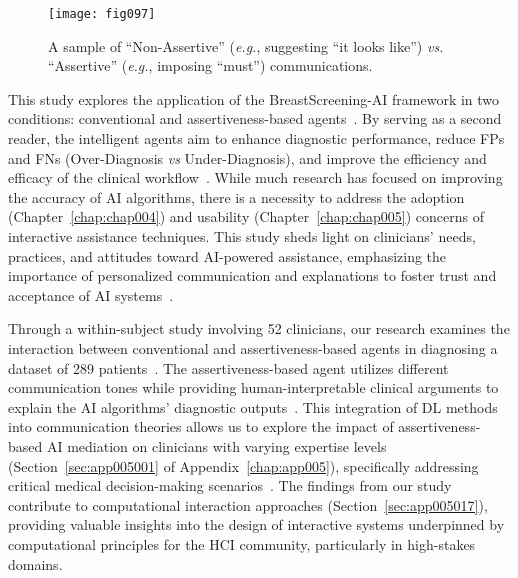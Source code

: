 \begin{figure}[htpb]
\texttt{[image: fig097]}
\caption[]{A sample of ``Non-Assertive'' ({\it e.g.}, suggesting ``it looks like'') {\it vs.} ``Assertive'' ({\it e.g.}, imposing ``must'') communications.}
\label{fig:fig097}
\end{figure}

This study explores the application of the BreastScreening-AI framework in two conditions: conventional and assertiveness-based agents~\cite{pacheco2019alignment, 10.1145/3311350.3347162}.
By serving as a second reader, the intelligent agents aim to enhance diagnostic performance, reduce \acp{FP} and \acp{FN} (Over-Diagnosis {\it vs} Under-Diagnosis), and improve the efficiency and efficacy of the clinical workflow~\cite{CALISTO2022102285, 10.1145/3311350.3347162}.
While much research has focused on improving the accuracy of \ac{AI} algorithms, there is a necessity to address the adoption (Chapter~\ref{chap:chap004}) and usability (Chapter~\ref{chap:chap005}) concerns of interactive assistance techniques.
This study sheds light on clinicians' needs, practices, and attitudes toward \ac{AI}-powered assistance, emphasizing the importance of personalized communication and explanations to foster trust and acceptance of \ac{AI} systems~\cite{10.1145/3491102.3502104, CALISTO2021102607}.

Through a within-subject study involving 52 clinicians, our research examines the interaction between conventional and assertiveness-based agents in diagnosing a dataset of 289 patients~\cite{PELAU2021106855}.
The assertiveness-based agent utilizes different communication tones while providing human-interpretable clinical arguments to explain the \ac{AI} algorithms' diagnostic outputs~\cite{10.1145/3544548.3580682}.
This integration of \ac{DL} methods into communication theories allows us to explore the impact of assertiveness-based \ac{AI} mediation on clinicians with varying expertise levels (Section~\ref{sec:app005001} of Appendix~\ref{chap:app005}), specifically addressing critical medical decision-making scenarios~\cite{Aldoj2020}.
The findings from our study contribute to computational interaction approaches (Section~\ref{sec:app005017}), providing valuable insights into the design of interactive systems underpinned by computational principles for the \ac{HCI} community, particularly in high-stakes domains.

\vspace{1.50mm}

